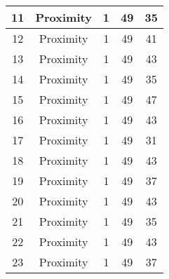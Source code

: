 \documentclass[results.tex]{subfiles}
\begin{document}
\begin{center}
\begin{tabular}{| c || c | c | c | c |}
            \hline
            11                      & Proximity                    & 1                      & 49                      & 35                   \\
            \hline
            12                      & Proximity                    & 1                      & 49                      & 41                   \\
            \hline
            13                      & Proximity                    & 1                      & 49                      & 43                   \\
            \hline
            14                      & Proximity                    & 1                      & 49                      & 35                   \\
            \hline
            15                      & Proximity                    & 1                      & 49                      & 47                   \\
            \hline
            16                      & Proximity                    & 1                      & 49                      & 43                   \\
            \hline
            17                      & Proximity                    & 1                      & 49                      & 31                   \\
            \hline
            18                      & Proximity                    & 1                      & 49                      & 43                   \\
            \hline
            19                      & Proximity                    & 1                      & 49                      & 37                   \\
            \hline
            20                      & Proximity                    & 1                      & 49                      & 43                   \\
            \hline
            21                      & Proximity                    & 1                      & 49                      & 35                   \\
            \hline
            22                      & Proximity                    & 1                      & 49                      & 43                   \\
            \hline
            23                      & Proximity                    & 1                      & 49                      & 37                   \\

\end{tabular}
\end{center}
\end{document}
